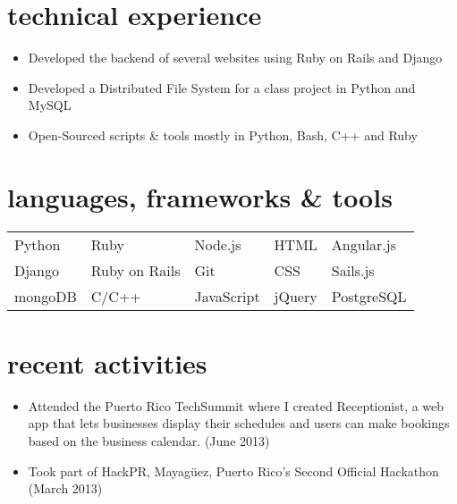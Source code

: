 \documentclass[]{friggeri-cv} %
\begin{document}
\section{technical experience}
\begin{itemize}\small
\item Developed the backend of several websites using Ruby on Rails and Django
\item Developed a Distributed File System for a class project in Python and MySQL
\item Open-Sourced scripts \& tools mostly in Python, Bash, C++ and Ruby
\end{itemize}



\section{languages, frameworks \& tools}

\setlength{\tabcolsep}{20pt}

\small
\begin{tabular}{lllll}
    Python   & Ruby           & Node.js    & HTML   & Angular.js \\
    Django   & Ruby on Rails  & Git        & CSS    & Sails.js   \\
    mongoDB  & C/C++          & JavaScript & jQuery & PostgreSQL
\end{tabular}


\section{recent activities}

\begin{itemize}\small
\item Attended the Puerto Rico TechSummit where I created Receptionist, a web app that lets businesses display their schedules and users can make bookings based on the business calendar. (June 2013)
\item Took part of HackPR, Mayagüez, Puerto Rico's Second Official Hackathon (March 2013)
\end{itemize}
\end{document}
